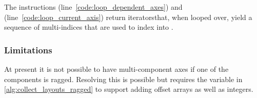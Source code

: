 \documentclass[thesis]{subfiles}
\begin{document}
The instructions  (line~\ref{code:loop_dependent_axes}) and  (line~\ref{code:loop_current_axis}) return iterators\footnotemark that, when looped over, yield a sequence of multi-indices that are used to index into .


\subsubsection{Limitations}

At present it is not possible to have multi-component axes if one of the components is ragged.
Resolving this is possible but requires the  variable in \cref{alg:collect_layouts_ragged} to support adding offset arrays as well as integers.
\end{document}
